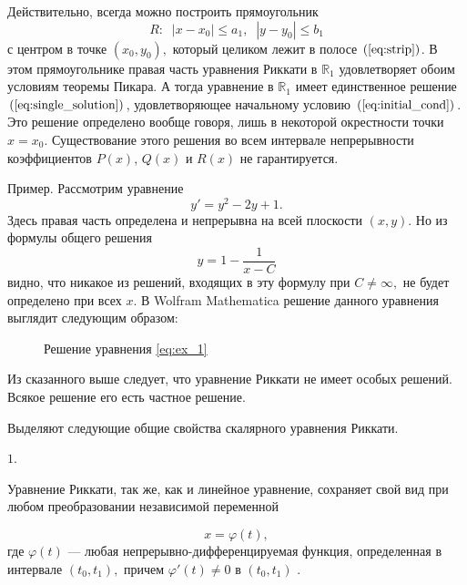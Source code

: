 Действительно, всегда можно построить прямоугольник
$$ R: \; \; \left| x - x_{0} \right| \leqslant a_{1}, \; \; \left| y - y_{0} \right| \leqslant b_{1}$$
с центром в точке $\left( x_{0}, y_{0} \right),$ который целиком лежит в полосе $\left( \ref{eq:strip} \right)$. В этом прямоугольнике правая часть уравнения Риккати в $\mathbb{R}_1$ удовлетворяет обоим условиям теоремы Пикара. А тогда уравнение в $\mathbb{R}_1$ имеет единственное решение $\left( \ref{eq:single_solution} \right)$, удовлетворяющее начальному условию $\left( \ref{eq:initial_cond} \right)$. Это решение определено вообще говоря, лишь в некоторой окрестности точки $x = x_{0}.$ Существование этого решения во всем интервале непрерывности коэффициентов $P \left( x \right)$, $Q \left( x \right)$ и $R \left( x \right)$ не гарантируется.

Пример. Рассмотрим уравнение
\begin{equation} \label{eq:ex_1}
    y' = y^{2} - 2 y + 1.
\end{equation}
Здесь правая часть определена и непрерывна на всей плоскости $\left( x, y \right)$. Но из формулы общего решения
$$y = 1 - \dfrac{1}{x - C}$$
видно, что никакое из решений, входящих в эту формулу при $C \neq \infty,$ не будет определено при всех $x$. В Wolfram Mathematica решение данного уравнения выглядит следующим образом:
\begin{figure}[H]
	\captionsetup{justification=centering}
	\caption{Решение уравнения \eqref{eq:ex_1}}
	\label{fig:predict_gauss_proc}
\end{figure}

Из сказанного выше следует, что уравнение Риккати не имеет особых решений. Всякое решение его есть частное решение.

Выделяют следующие общие свойства скалярного уравнения Риккати.

\hypertarget{first_prop}{$1.$} Уравнение Риккати, так же, как и линейное уравнение, сохраняет свой вид при любом преобразовании независимой переменной

\begin{equation}  \label{eq:replacement}
    x = \varphi \left( t \right),
\end{equation}
где $\varphi \left( t \right)$ --- любая непрерывно-дифференцируемая функция, определенная в интервале $\left( t_{0}, t_{1} \right),$ причем $\varphi' \left( t \right) \neq 0$ в $\left( t_{0}, t_{1} \right)$ \cite{matveev}.

